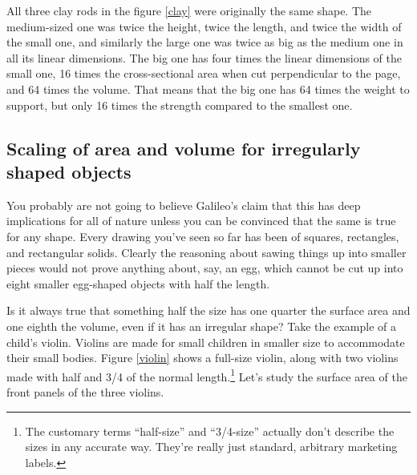 All three clay rods
 in the figure \ref{clay} were originally the same
 shape. The medium-sized one was
 twice the height, twice the length, and
 twice the width of the small one, and
 similarly the large one was twice as
 big as the medium one in all its linear
 dimensions. The big one has four
 times the linear dimensions of the
 small one, 16 times the cross-sectional
 area when cut perpendicular to the
 page, and 64 times the volume. That
 means that the big one has 64 times
 the weight to support, but only 16 times
 the strength compared to the smallest
 one.

\vspace{1.5mm}

\subsection{Scaling of area and volume for irregularly shaped objects}

You probably are not going to believe Galileo's claim that
this has deep implications for all of nature unless you can
be convinced that the same is true for any shape. Every
drawing you've seen so far has been of squares, rectangles,
and rectangular solids. Clearly the reasoning about sawing
things up into smaller pieces would not prove anything
about, say, an egg, which cannot be cut up into eight
smaller egg-shaped objects with half the length.



\vspace{1.5mm}

Is it always true that something half the size has one
quarter the surface area and one eighth the volume, even if
it has an irregular shape? Take the example of a child's
violin. Violins are made for small children in smaller size
to accommodate their small bodies. Figure \ref{violin} shows
a full-size violin, along with two
violins made with half and 3/4 of the normal length.\footnote{The customary
terms ``half-size'' and ``3/4-size'' actually don't describe the
sizes in any accurate way. They're really just standard, arbitrary
marketing labels.}
Let's study the surface area of the front
panels of the three violins.

